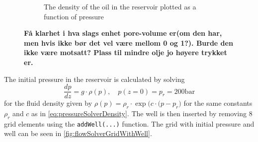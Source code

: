 \begin{figure}[htb]
\begin{subfigure}[t]{0.48\textwidth}
        \caption{The density of the oil in the reservoir plotted as a function of pressure}
        \label{fig:flowSolverPoreVolume}
    \end{subfigure}
    \caption{\textbf{Få klarhet i hva slags enhet pore-volume er(om den har, men hvis ikke bør det vel være mellom 0 og 1?). Burde den ikke være motsatt? Plass til mindre olje jo høyere trykket er.}}
\end{figure}

The initial pressure in the reservoir is calculated by solving
\begin{equation*}
    \frac{dp}{dz} = g\cdot \rho(p), \quad p(z = 0) = p_r = 200\text{bar} 
\end{equation*}  
for the fluid density given by $\rho(p) = \rho_r\cdot\exp\big(c\cdot(p-p_r\big)$ for the same constants $\rho_r$ and $c$ as in \autoref{eq:pressureSolverDensity}. The well is then inserted by removing 8 grid elements using the \texttt{addWell(...)} function. The grid with initial pressure and well can be seen in \autoref{fig:flowSolverGridWithWell}.
